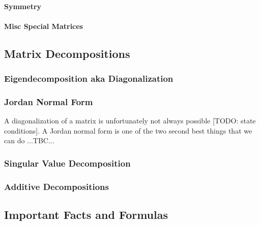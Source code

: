 \paragraph{Symmetry}

\paragraph{Misc Special Matrices}










\subsection{Matrix Decompositions}


\subsubsection{Eigendecomposition aka Diagonalization}


\subsubsection{Jordan Normal Form}
A diagonalization of a matrix is unfortunately not always possible [TODO: state conditions]. A Jordan normal form is one of the two second best things that we can do ...TBC...


\subsubsection{Singular Value Decomposition}



\subsubsection{Additive Decompositions}



\subsection{Important Facts and Formulas}